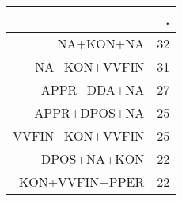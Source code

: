 \begin{tabular}{rr}
  \hline
 & . \\ 
  \hline
NA+KON+NA &  32 \\ 
  NA+KON+VVFIN &  31 \\ 
  APPR+DDA+NA &  27 \\ 
  APPR+DPOS+NA &  25 \\ 
  VVFIN+KON+VVFIN &  25 \\ 
  DPOS+NA+KON &  22 \\ 
  KON+VVFIN+PPER &  22 \\ 
   \hline
\end{tabular}
